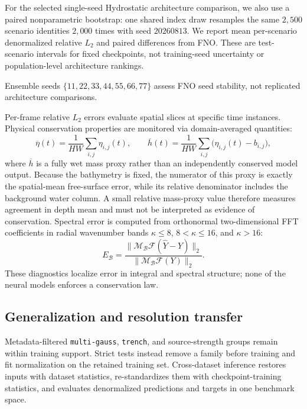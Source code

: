 For the selected single-seed Hydrostatic architecture comparison, we also use a paired nonparametric bootstrap: one shared index draw resamples the same $2{,}500$ scenario identities $2{,}000$ times with seed $20260813$. We report mean per-scenario denormalized relative $L_2$ and paired differences from FNO. These are test-scenario intervals for fixed checkpoints, not training-seed uncertainty or population-level architecture rankings.

Ensemble seeds $\{11, 22, 33, 44, 55, 66, 77\}$ assess FNO seed stability, not replicated architecture comparisons.

Per-frame relative $L_2$ errors evaluate spatial slices at specific time instances. Physical conservation properties are monitored via domain-averaged quantities:
\begin{equation}
\overline{\eta}(t) = \frac{1}{HW}\sum_{i, j}\eta_{i, j}(t),
\qquad
\overline{h}(t) = \frac{1}{HW}\sum_{i, j}\bigl(\eta_{i, j}(t) - b_{i, j}\bigr),
\end{equation}
where $\overline{h}$ is a fully wet mass proxy rather than an independently conserved model output. Because the bathymetry is fixed, the numerator of this proxy is exactly the spatial-mean free-surface error, while its relative denominator includes the background water column. A small relative mass-proxy value therefore measures agreement in depth mean and must not be interpreted as evidence of conservation. Spectral error is computed from orthonormal two-dimensional FFT coefficients in radial wavenumber bands $\kappa \leq 8$, $8 < \kappa \leq 16$, and $\kappa > 16$:
\begin{equation}
E_{\mathcal{B}} = \frac{\|\mathcal{M}_{\mathcal{B}}\mathcal{F}(\widehat{Y} - Y)\|_2}{\|\mathcal{M}_{\mathcal{B}}\mathcal{F}(Y)\|_2}.
\end{equation}
These diagnostics localize error in integral and spectral structure; none of the neural models enforces a conservation law.

\subsection{Generalization and resolution transfer}
\label{subsec:generalization-protocol}

Metadata-filtered \texttt{multi-gauss}, \texttt{trench}, and source-strength groups remain within training support. Strict tests instead remove a family before training and fit normalization on the retained training set. Cross-dataset inference restores inputs with dataset statistics, re-standardizes them with checkpoint-training statistics, and evaluates denormalized predictions and targets in one benchmark space.


